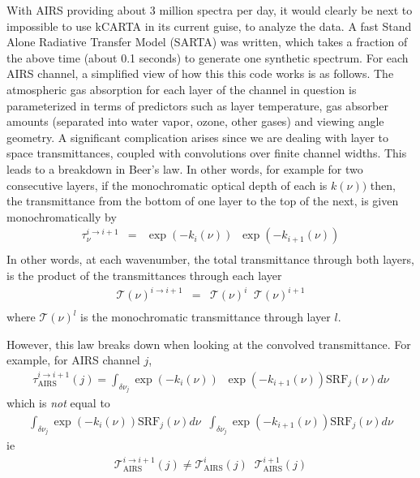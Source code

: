 \documentclass[11pt]{article}
\newcommand{\kc}{\textsf{kCARTA}\xspace}
\begin{document}
With AIRS providing about 3 million spectra per day, it would clearly
be next to impossible to use \kc in its current guise, to analyze the
data. A fast Stand Alone Radiative Transfer Model (SARTA) was written,
which takes a fraction of the above time (about 0.1 seconds) to
generate one synthetic spectrum. For each AIRS channel, a simplified
view of how this this code works is as follows. The atmospheric gas
absorption for
each layer of the channel in question is parameterized in terms of
predictors such as layer temperature, gas absorber amounts (separated
into water vapor, ozone, other gases) and viewing angle geometry. A
significant complication arises since we are dealing with layer to
space transmittances, coupled with convolutions over finite channel
widths. This leads to a breakdown in Beer's law. In other words, for
example for two consecutive layers, if the monochromatic optical depth
of each is $k(\nu))$ then, the transmittance from the bottom of one
layer to the top of the next, is given monochromatically by
\begin{eqnarray*}
  \tau_{\nu}^{i \rightarrow i+1} & = & \exp(-k_{i}(\nu)) \;\; \exp(-k_{i+1}(\nu)) \\
\end{eqnarray*}
In other words, at each wavenumber, the total transmittance through
both layers, is the product of the transmittances through each layer
\begin{eqnarray*}
  \mathcal{T}(\nu)^{i \rightarrow i+1}           & = &  \mathcal{T}(\nu)^{i} \;\;  \mathcal{T}(\nu)^{i+1}\\
\end{eqnarray*}
where $\mathcal{T}(\nu)^{l}$ is the monochromatic transmittance
through layer $l$.

However, this law breaks down when looking at the convolved
transmittance. For example, for AIRS channel $j$,
\begin{eqnarray*}
  \tau_{\text{AIRS}}^{i \rightarrow i+1}(j) = \int_{\delta \nu_{j}} \exp(-k_{i}(\nu)) \;\; \exp(-k_{i+1}(\nu)) \text{SRF}_{j}(\nu) d\nu
\end{eqnarray*}
which is \emph{not} equal to
\begin{eqnarray*}
  \int_{\delta \nu_{j}} \exp(-k_{i}(\nu)) \text{SRF}_{j}(\nu) d\nu \;\; \int_{\delta \nu_{j}} \exp(-k_{i+1}(\nu)) \text{SRF}_{j}(\nu) d\nu
\end{eqnarray*}
ie
\begin{eqnarray*}
  \mathcal{T}_{\text{AIRS}}^{i \rightarrow i+1}(j) \ne  \mathcal{T}_{\text{AIRS}}^{i}(j) \;\; \mathcal{T}_{\text{AIRS}}^{i+1}(j)
\end{eqnarray*}
\end{document}
